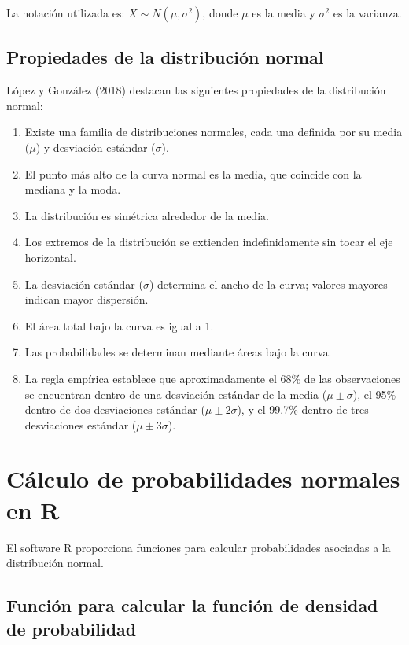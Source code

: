 \documentclass[
  spanish,
  letterpaper,
]{book}
\begin{document}
La notación utilizada es: \(X \sim N(\mu, \sigma^2)\), donde \(\mu\) es
la media y \(\sigma^2\) es la varianza.

\subsection{Propiedades de la distribución
normal}\label{propiedades-de-la-distribuciuxf3n-normal}

López y González (2018) destacan las siguientes propiedades de la
distribución normal:

\begin{enumerate}
\def\labelenumi{\arabic{enumi}.}
\item
  Existe una familia de distribuciones normales, cada una definida por
  su media (\(\mu\)) y desviación estándar (\(\sigma\)).
\item
  El punto más alto de la curva normal es la media, que coincide con la
  mediana y la moda.
\item
  La distribución es simétrica alrededor de la media.
\item
  Los extremos de la distribución se extienden indefinidamente sin tocar
  el eje horizontal.
\item
  La desviación estándar (\(\sigma\)) determina el ancho de la curva;
  valores mayores indican mayor dispersión.
\item
  El área total bajo la curva es igual a 1.
\item
  Las probabilidades se determinan mediante áreas bajo la curva.
\item
  La regla empírica establece que aproximadamente el 68\% de las
  observaciones se encuentran dentro de una desviación estándar de la
  media (\(\mu \pm \sigma\)), el 95\% dentro de dos desviaciones
  estándar (\(\mu \pm 2\sigma\)), y el 99.7\% dentro de tres
  desviaciones estándar (\(\mu \pm 3\sigma\)).
\end{enumerate}

\section{Cálculo de probabilidades normales en
R}\label{cuxe1lculo-de-probabilidades-normales-en-r}

El software R proporciona funciones para calcular probabilidades
asociadas a la distribución normal.

\subsection{Función para calcular la función de densidad de
probabilidad}\label{funciuxf3n-para-calcular-la-funciuxf3n-de-densidad-de-probabilidad}
\end{document}

